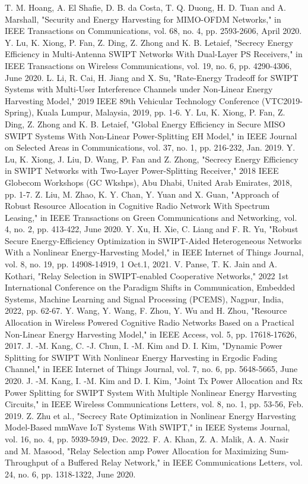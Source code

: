 \documentclass[conference]{IEEEtran}
\begin{document}
\begin{thebibliography}{00}
 T. M. Hoang, A. El Shafie, D. B. da Costa, T. Q. Duong, H. D. Tuan and A. Marshall, "Security and Energy Harvesting for MIMO-OFDM Networks," in IEEE Transactions on Communications, vol. 68, no. 4, pp. 2593-2606, April 2020.
 Y. Lu, K. Xiong, P. Fan, Z. Ding, Z. Zhong and K. B. Letaief, "Secrecy Energy Efficiency in Multi-Antenna SWIPT Networks With Dual-Layer PS Receivers," in IEEE Transactions on Wireless Communications, vol. 19, no. 6, pp. 4290-4306, June 2020.
 L. Li, R. Cai, H. Jiang and X. Su, "Rate-Energy Tradeoff for SWIPT Systems with Multi-User Interference Channels under Non-Linear Energy Harvesting Model," 2019 IEEE 89th Vehicular Technology Conference (VTC2019-Spring), Kuala Lumpur, Malaysia, 2019, pp. 1-6.
 Y. Lu, K. Xiong, P. Fan, Z. Ding, Z. Zhong and K. B. Letaief, "Global Energy Efficiency in Secure MISO SWIPT Systems With Non-Linear Power-Splitting EH Model," in IEEE Journal on Selected Areas in Communications, vol. 37, no. 1, pp. 216-232, Jan. 2019.
 Y. Lu, K. Xiong, J. Liu, D. Wang, P. Fan and Z. Zhong, "Secrecy Energy Efficiency in SWIPT Networks with Two-Layer Power-Splitting Receiver," 2018 IEEE Globecom Workshops (GC Wkshps), Abu Dhabi, United Arab Emirates, 2018, pp. 1-7.
 Z. Liu, M. Zhao, K. Y. Chan, Y. Yuan and X. Guan, "Approach of Robust Resource Allocation in Cognitive Radio Network With Spectrum Leasing," in IEEE Transactions on Green Communications and Networking, vol. 4, no. 2, pp. 413-422, June 2020.
 Y. Xu, H. Xie, C. Liang and F. R. Yu, "Robust Secure Energy-Efficiency Optimization in SWIPT-Aided Heterogeneous Networks With a Nonlinear Energy-Harvesting Model," in IEEE Internet of Things Journal, vol. 8, no. 19, pp. 14908-14919, 1 Oct.1, 2021.
 V. Panse, T. K. Jain and A. Kothari, "Relay Selection in SWIPT-enabled Cooperative Networks," 2022 1st International Conference on the Paradigm Shifts in Communication, Embedded Systems, Machine Learning and Signal Processing (PCEMS), Nagpur, India, 2022, pp. 62-67.
 Y. Wang, Y. Wang, F. Zhou, Y. Wu and H. Zhou, "Resource Allocation in Wireless Powered Cognitive Radio Networks Based on a Practical Non-Linear Energy Harvesting Model," in IEEE Access, vol. 5, pp. 17618-17626, 2017.
 J. -M. Kang, C. -J. Chun, I. -M. Kim and D. I. Kim, "Dynamic Power Splitting for SWIPT With Nonlinear Energy Harvesting in Ergodic Fading Channel," in IEEE Internet of Things Journal, vol. 7, no. 6, pp. 5648-5665, June 2020.
 J. -M. Kang, I. -M. Kim and D. I. Kim, "Joint Tx Power Allocation and Rx Power Splitting for SWIPT System With Multiple Nonlinear Energy Harvesting Circuits," in IEEE Wireless Communications Letters, vol. 8, no. 1, pp. 53-56, Feb. 2019.
 Z. Zhu et al., "Secrecy Rate Optimization in Nonlinear Energy Harvesting Model-Based mmWave IoT Systems With SWIPT," in IEEE Systems Journal, vol. 16, no. 4, pp. 5939-5949, Dec. 2022.
 F. A. Khan, Z. A. Malik, A. A. Nasir and M. Masood, "Relay Selection amp Power Allocation for Maximizing Sum-Throughput of a Buffered Relay Network," in IEEE Communications Letters, vol. 24, no. 6, pp. 1318-1322, June 2020.
\end{thebibliography}
\end{document}
